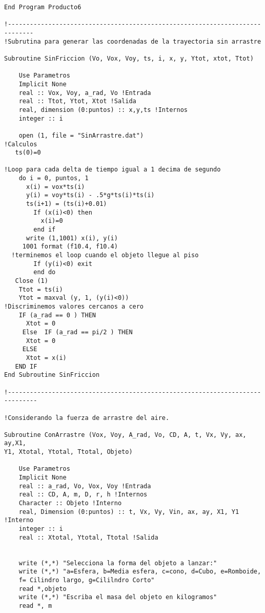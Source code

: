 \documentclass[letterpaper,10pt,twoside,onecolumn]{article}
\begin{document}
\begin{verbatim}
End Program Producto6

!-----------------------------------------------------------------------------
!Subrutina para generar las coordenadas de la trayectoria sin arrastre

Subroutine SinFriccion (Vo, Vox, Voy, ts, i, x, y, Ytot, xtot, Ttot)
    
    Use Parametros
    Implicit None
    real :: Vox, Voy, a_rad, Vo !Entrada
    real :: Ttot, Ytot, Xtot !Salida
    real, dimension (0:puntos) :: x,y,ts !Internos
    integer :: i

    open (1, file = "SinArrastre.dat") 
!Calculos
   ts(0)=0
     
!Loop para cada delta de tiempo igual a 1 decima de segundo
    do i = 0, puntos, 1
      x(i) = vox*ts(i)
      y(i) = voy*ts(i) - .5*g*ts(i)*ts(i)
      ts(i+1) = (ts(i)+0.01)
        If (x(i)<0) then
          x(i)=0
        end if 
      write (1,1001) x(i), y(i)
     1001 format (f10.4, f10.4)
  !terminemos el loop cuando el objeto llegue al piso
        If (y(i)<0) exit
        end do   
   Close (1)
    Ttot = ts(i)
    Ytot = maxval (y, 1, (y(i)<0))
!Discriminemos valores cercanos a cero
    IF (a_rad == 0 ) THEN
      Xtot = 0
     Else  IF (a_rad == pi/2 ) THEN
      Xtot = 0  
     ELSE 
      Xtot = x(i) 
   END IF 
End Subroutine SinFriccion

!------------------------------------------------------------------------------

!Considerando la fuerza de arrastre del aire.

Subroutine ConArrastre (Vox, Voy, A_rad, Vo, CD, A, t, Vx, Vy, ax, ay,X1, 
Y1, Xtotal, Ytotal, Ttotal, Objeto)

    Use Parametros
    Implicit None
    real :: a_rad, Vo, Vox, Voy !Entrada
    real :: CD, A, m, D, r, h !Internos
    Character :: Objeto !Interno
    real, Dimension (0:puntos) :: t, Vx, Vy, Vin, ax, ay, X1, Y1 !Interno
    integer :: i
    real :: Xtotal, Ytotal, Ttotal !Salida


    write (*,*) "Selecciona la forma del objeto a lanzar:"
    write (*,*) "a=Esfera, b=Media esfera, c=cono, d=Cubo, e=Romboide, 
    f= Cilindro largo, g=Cililndro Corto"
    read *,objeto
    write (*,*) "Escriba el masa del objeto en kilogramos"
    read *, m


\end{verbatim}
\end{document}

